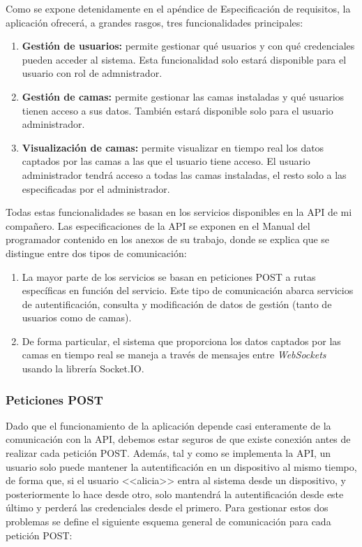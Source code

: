 Como se expone detenidamente en el apéndice de Especificación de requisitos, la aplicación ofrecerá, a grandes rasgos, tres funcionalidades principales: 

\begin{enumerate}
	\item \textbf{Gestión de usuarios:} permite gestionar qué usuarios y con qué credenciales pueden acceder al sistema. Esta funcionalidad solo estará disponible para el usuario con rol de admnistrador. 
	\item \textbf{Gestión de camas:} permite gestionar las camas instaladas y qué usuarios tienen acceso a sus datos. También estará disponible solo para el usuario administrador. 
	\item \textbf{Visualización de camas:} permite visualizar en tiempo real los datos captados por las camas a las que el usuario tiene acceso. El usuario administrador tendrá acceso a todas las camas instaladas, el resto solo a las especificadas por el administrador. 
\end{enumerate}

Todas estas funcionalidades se basan en los servicios disponibles en la API de mi compañero. Las especificaciones de la API se exponen en el Manual del programador contenido en los anexos de su trabajo, donde se explica que se distingue entre dos tipos de comunicación: 

\begin{enumerate}
	\item La mayor parte de los servicios se basan en peticiones POST a rutas específicas en función del servicio. Este tipo de comunicación abarca servicios de autentificación, consulta y modificación de datos de gestión (tanto de usuarios como de camas). 
	\item De forma particular, el sistema que proporciona los datos captados por las camas en tiempo real se maneja a través de mensajes entre \textit{WebSockets} usando la librería Socket.IO. 
\end{enumerate}

\subsubsection{Peticiones POST}
Dado que el funcionamiento de la aplicación depende casi enteramente de la comunicación con la API, debemos estar seguros de que existe conexión antes de realizar cada petición POST. Además, tal y como se implementa la API, un usuario solo puede mantener la autentificación en un dispositivo al mismo tiempo, de forma que, si el usuario <<alicia>> entra al sistema desde un dispositivo, y posteriormente lo hace desde otro, solo mantendrá la autentificación desde este último y perderá las credenciales desde el primero. Para gestionar estos dos problemas se define el siguiente esquema general de comunicación para cada petición POST:  


